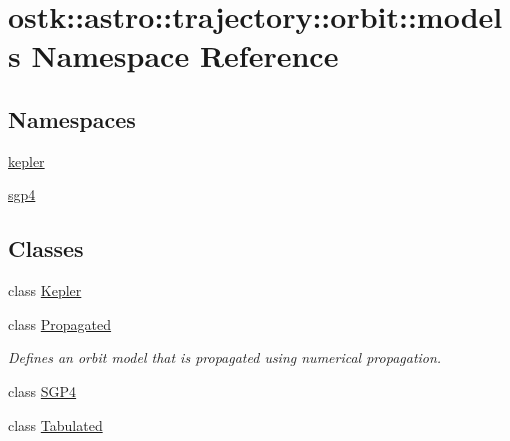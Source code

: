 \hypertarget{namespaceostk_1_1astro_1_1trajectory_1_1orbit_1_1models}{}\section{ostk\+:\+:astro\+:\+:trajectory\+:\+:orbit\+:\+:models Namespace Reference}
\label{namespaceostk_1_1astro_1_1trajectory_1_1orbit_1_1models}
\subsection*{Namespaces}
\begin{DoxyCompactItemize}
\item 
 \hyperlink{namespaceostk_1_1astro_1_1trajectory_1_1orbit_1_1models_1_1kepler}{kepler}
\item 
 \hyperlink{namespaceostk_1_1astro_1_1trajectory_1_1orbit_1_1models_1_1sgp4}{sgp4}
\end{DoxyCompactItemize}
\subsection*{Classes}
\begin{DoxyCompactItemize}
\item 
class \hyperlink{classostk_1_1astro_1_1trajectory_1_1orbit_1_1models_1_1_kepler}{Kepler}
\item 
class \hyperlink{classostk_1_1astro_1_1trajectory_1_1orbit_1_1models_1_1_propagated}{Propagated}
\begin{DoxyCompactList}\small\item\em Defines an orbit model that is propagated using numerical propagation. \end{DoxyCompactList}\item 
class \hyperlink{classostk_1_1astro_1_1trajectory_1_1orbit_1_1models_1_1_s_g_p4}{S\+G\+P4}
\item 
class \hyperlink{classostk_1_1astro_1_1trajectory_1_1orbit_1_1models_1_1_tabulated}{Tabulated}
\end{DoxyCompactItemize}

